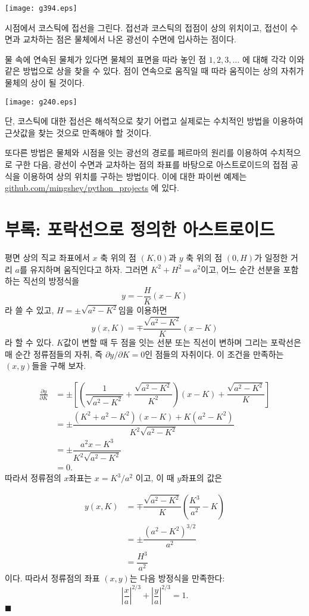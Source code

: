 \documentclass[twocolumn]{article}
\begin{document}
\texttt{[image: g394.eps]}

시점에서 코스틱에 접선을 그린다. 접선과 코스틱의 접점이 상의 위치이고, 접선이 수면과 
교차하는 점은 물체에서 나온 광선이 수면에 입사하는 점이다.

물 속에 연속된 물체가 있다면 물체의 표면을 따라 놓인 점 $1, 2, 3, \dots$ 에 대해 
각각 이와 같은 방법으로 상을 찾을 수 있다. 점이 연속으로 움직일 때 따라 움직이는 상의 자취가 
물체의 상이 될 것이다.

\texttt{[image: g240.eps]}

단, 코스틱에 대한 접선은 해석적으로 찾기 어렵고 실제로는 수치적인 방법을 이용하여 
근삿값을 찾는 것으로 만족해야 할 것이다.

또다른 방법은 물체와 시점을 잇는 광선의 경로를 페르마의 원리를 이용하여 수치적으로 
구한 다음, 광선이 수면과 교차하는 점의 좌표를 바탕으로 아스트로이드의 접점 공식을 이용하여
상의 위치를 구하는 방법이다. 이에 대한 파이썬 예제는  
\href{https://github.com/mingshey/python_projects/blob/main/Refraction_Image.ipynb}%
{github.com/mingshey/python\_projects} 에 있다.


\appendix
\section*{부록: 포락선으로 정의한 아스트로이드}
평면 상의 직교 좌표에서 $x$ 축 위의 점  $(K, 0)$과 $y$ 축 위의 점 $(0, H)$가 일정한 거리 $a$를 유지하며 움직인다고 하자. 그러면 $K^2+H^2=a^2$이고, 어느 순간 선분을 포함하는 직선의 방정식을 
$$y=-\dfrac{H}{K}(x-K)$$
라 쓸 수 있고, $H=\pm \sqrt{a^2-K^2}$임을 이용하면 
$$y(x, K) = \mp \dfrac{\sqrt{a^2-K^2}}{K}(x-K)$$
라 할 수 있다. 
$K$값이 변할 때 두 점을 잇는 선분 또는 직선이 변하며 그리는 포락선은 매 순간 정류점들의 자취, 즉
\newcommand{\pardiff}[2]{{\frac{\partial #1}{\partial #2}}}
\newcommand{\ilpardiff}[2]{{{\partial #1}/{\partial #2}}}
$\ilpardiff{y}{K} = 0$인 점들의 자취이다. 이 조건을 만족하는 $(x, y)$들을 구해 보자.

$$ \begin{aligned}
\pardiff{y}{K} &= \pm\left[\left( \dfrac{1}{\sqrt{a^2-K^2}}+\dfrac{\sqrt{a^2-K^2}}{K^2}\right) (x-K) + \dfrac{\sqrt{a^2-K^2}}{K} \right]\\
	&= \pm \dfrac{(K^2+a^2-K^2)(x-K)+K(a^2-K^2)}{K^2\sqrt{a^2-K^2}}\\
	&= \pm \dfrac{a^2 x - K^3}{K^2 \sqrt{a^2 - K^2}}\\
	&= 0.
\end{aligned}
$$
따라서 정류점의 $x$좌표는 $x = K^3/a^2$ 이고, 이 때 $y$좌표의 값은

$$ \begin{aligned}
y(x, K) &= \mp \dfrac{\sqrt{a^2-K^2}}{K}\left(\dfrac{K^3}{a^2}-K\right)\\
	& = \pm \dfrac{\left( a^2- K^2 \right)^{3/2}}{a^2}\\
	& = \dfrac{H^3}{a^2}
\end{aligned}
$$
이다. 따라서 정류점의 좌표 $(x, y)$는 다음 방정식을 만족한다:
$$ \left|\dfrac{x}{a}\right|^{2/3} + \left|\dfrac{y}{a}\right|^{2/3} = 1. $$
$\blacksquare$
\end{document}
